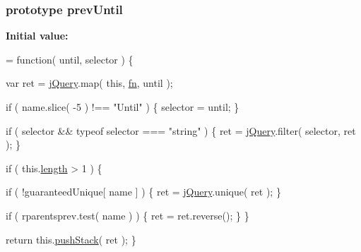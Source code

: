 \subsubsection[{prev\+Until}]{ {\bf prototype} prev\+Until}\label{jquery-1_810_82-vsdoc_8js_a261c6b8aae4b0d984ef1bb06c1caa7d1}
{\bfseries Initial value\+:}
\begin{DoxyCode}
= \textcolor{keyword}{function}( until, selector ) \{


        var ret = \hyperlink{jquery-1_810_82-vsdoc_8js_add5237586d970a38a81f990e8eb28c6c}{jQuery}.map( \textcolor{keyword}{this}, \hyperlink{jquery-1_810_82-vsdoc_8js_acef6bdaf6b9b20fdcca1ea86f0902c3b}{fn}, until );

        \textcolor{keywordflow}{if} ( name.slice( -5 ) !== \textcolor{stringliteral}{"Until"} ) \{
            selector = until;
        \}

        \textcolor{keywordflow}{if} ( selector && typeof selector === \textcolor{stringliteral}{"string"} ) \{
            ret = \hyperlink{jquery-1_810_82-vsdoc_8js_add5237586d970a38a81f990e8eb28c6c}{jQuery}.filter( selector, ret );
        \}

        \textcolor{keywordflow}{if} ( this.\hyperlink{jquery-1_810_82-vsdoc_8js_aa7de35d58da66d9944ab9cbe82c19640}{length} > 1 ) \{
            
            \textcolor{keywordflow}{if} ( !guaranteedUnique[ name ] ) \{
                ret = \hyperlink{jquery-1_810_82-vsdoc_8js_add5237586d970a38a81f990e8eb28c6c}{jQuery}.unique( ret );
            \}

            
            \textcolor{keywordflow}{if} ( rparentsprev.test( name ) ) \{
                ret = ret.reverse();
            \}
        \}

        \textcolor{keywordflow}{return} this.\hyperlink{jquery-1_810_82-vsdoc_8js_afc3a7db1ef2b526338c06c07cecccd44}{pushStack}( ret );
    \}
\end{DoxyCode}
\hypertarget{jquery-1_810_82-vsdoc_8js_a06426ace6e929cd19d94010b6c27109d}{}
